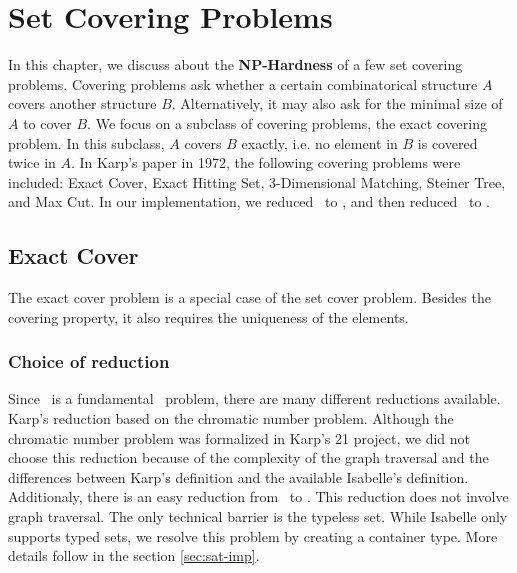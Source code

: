 \chapter{Set Covering Problems}\label{chapter:covering}
In this chapter, we discuss about the \textbf{NP-Hardness} of a few set covering problems. 
Covering problems ask whether a certain combinatorical structure $A$ covers another structure $B$. 
Alternatively, it may also ask for the minimal size of $A$ to cover $B$. 
We focus on a subclass of covering problems, the exact covering problem. In this subclass, 
$A$ covers $B$ exactly, i.e. no element in $B$ is covered twice in $A$. 
In Karp's paper in 1972, the following covering problems were included: Exact Cover, Exact Hitting Set,
3-Dimensional Matching, Steiner Tree, and Max Cut. In our implementation, we reduced \SAT\ to \XC, and then reduced \XC\ to \HS. 

\section{Exact Cover}
The exact cover problem is a special case of the set cover problem. Besides the covering property, it also requires the uniqueness of the elements. 

\subsection{Choice of reduction}
Since \XC\ is a fundamental \NPH\ problem, there are many different reductions available. 
Karp's reduction based on the chromatic number problem. 
Although the chromatic number problem was formalized in Karp's 21 project, we did not choose this reduction
because of the complexity of the graph traversal and the differences between Karp's definition and the available Isabelle's definition. 
Additionaly, there is an easy reduction from \SAT\ to \XC. This reduction does not involve graph traversal.
The only technical barrier is the typeless set. While Isabelle only supports typed sets, we resolve this problem
by creating a container type. More details follow in the section \ref*{sec:sat-imp}. 

